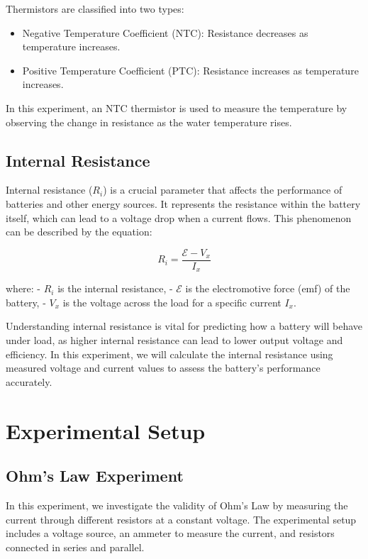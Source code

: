 \documentclass[journal]{IEEEtran}
\begin{document}
Thermistors are classified into two types:
\begin{itemize}
    \item Negative Temperature Coefficient (NTC): Resistance decreases as temperature increases.
    \item Positive Temperature Coefficient (PTC): Resistance increases as temperature increases.
\end{itemize}

In this experiment, an NTC thermistor is used to measure the temperature by observing the change in resistance as the water temperature rises.
\subsection{Internal Resistance}
Internal resistance (\( R_i \)) is a crucial parameter that affects the performance of batteries and other energy sources. It represents the resistance within the battery itself, which can lead to a voltage drop when a current flows. This phenomenon can be described by the equation:

\begin{equation}
    R_{i} = \frac{\mathcal{E} - V_x}{I_x}
\end{equation}

where:
- \( R_i \) is the internal resistance,
- \( \mathcal{E} \) is the electromotive force (emf) of the battery,
- \( V_x \) is the voltage across the load for a specific current \( I_x \).

Understanding internal resistance is vital for predicting how a battery will behave under load, as higher internal resistance can lead to lower output voltage and efficiency. In this experiment, we will calculate the internal resistance using measured voltage and current values to assess the battery's performance accurately.

\section{Experimental Setup}
\subsection{Ohm's Law Experiment}
In this experiment, we investigate the validity of Ohm’s Law by measuring the current through different resistors at a constant voltage. The experimental setup includes a voltage source, an ammeter to measure the current, and resistors connected in series and parallel.
\end{document}
